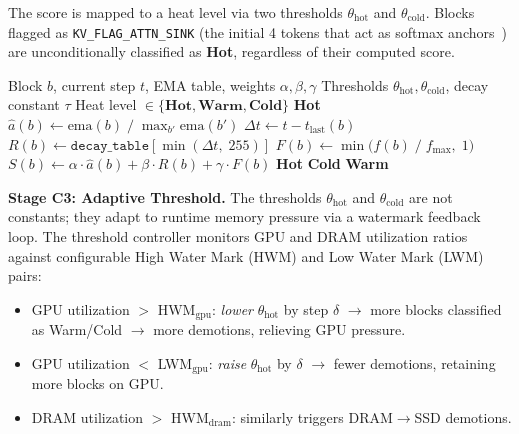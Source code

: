 \documentclass[conference]{IEEEtran}
\begin{document}
The score is mapped to a heat level via two thresholds $\theta_{\text{hot}}$ and $\theta_{\text{cold}}$. Blocks flagged as \texttt{KV\_FLAG\_ATTN\_SINK} (the initial 4 tokens that act as softmax anchors~\cite{streamingllm}) are unconditionally classified as \textbf{Hot}, regardless of their computed score.

\begin{algorithm}[t]
\caption{Per-Block Hot-Cold Classification (C1+C2)}
\label{alg:classify}
\begin{algorithmic}
\Require Block $b$, current step $t$, EMA table, weights $\alpha, \beta, \gamma$
\Require Thresholds $\theta_{\text{hot}}, \theta_{\text{cold}}$, decay constant $\tau$
\Ensure Heat level $\in \{\textbf{Hot}, \textbf{Warm}, \textbf{Cold}\}$
\Statex
{} 
    \State \Return \textbf{Hot}
\EndIf
\Statex
\State $\hat{a}(b) \gets \text{ema}(b) \;/\; \max_{b'} \text{ema}(b')$ 
\State $\Delta t \gets t - t_{\text{last}}(b)$ 
\State $R(b) \gets \texttt{decay\_table}[\min(\Delta t,\; 255)]$ 
\State $F(b) \gets \min\bigl(f(b) \;/\; f_{\max},\; 1\bigr)$ 
\Statex
\State $S(b) \gets \alpha \cdot \hat{a}(b) + \beta \cdot R(b) + \gamma \cdot F(b)$ 
\Statex
{}
    \State \Return \textbf{Hot} 
    \State \Return \textbf{Cold} 
\Else
    \State \Return \textbf{Warm} 
\EndIf
\end{algorithmic}
\end{algorithm}

\textbf{Stage C3: Adaptive Threshold.} The thresholds $\theta_{\text{hot}}$ and $\theta_{\text{cold}}$ are not constants; they adapt to runtime memory pressure via a watermark feedback loop. The threshold controller monitors GPU and DRAM utilization ratios against configurable High Water Mark (HWM) and Low Water Mark (LWM) pairs:

\begin{itemize}
\item GPU utilization $>$ HWM$_{\text{gpu}}$: \emph{lower} $\theta_{\text{hot}}$ by step $\delta$ $\to$ more blocks classified as Warm/Cold $\to$ more demotions, relieving GPU pressure.
\item GPU utilization $<$ LWM$_{\text{gpu}}$: \emph{raise} $\theta_{\text{hot}}$ by $\delta$ $\to$ fewer demotions, retaining more blocks on GPU.
\item DRAM utilization $>$ HWM$_{\text{dram}}$: similarly triggers DRAM$\to$SSD demotions.
\end{itemize}
\end{document}
